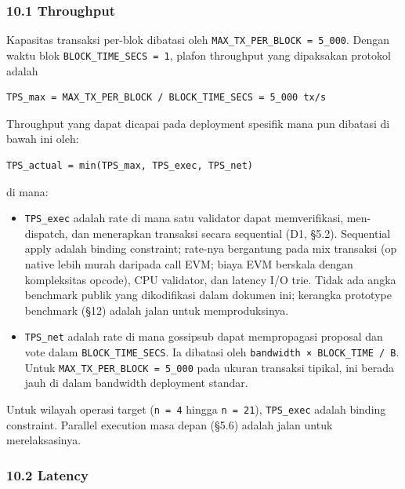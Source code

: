 \documentclass[11pt,a4paper]{article}
\providecommand{\tightlist}{\setlength{\itemsep}{0pt}\setlength{\parskip}{0pt}}
\begin{document}
\hypertarget{throughput}{%
\subsubsection{10.1 Throughput}\label{throughput}}

Kapasitas transaksi per-blok dibatasi oleh \texttt{MAX\_TX\_PER\_BLOCK\ =\ 5\_000}. Dengan waktu blok \texttt{BLOCK\_TIME\_SECS\ =\ 1}, plafon throughput yang dipaksakan protokol adalah

\begin{verbatim}
TPS_max = MAX_TX_PER_BLOCK / BLOCK_TIME_SECS = 5_000 tx/s
\end{verbatim}

Throughput yang dapat dicapai pada deployment spesifik mana pun dibatasi di bawah ini oleh:

\begin{verbatim}
TPS_actual = min(TPS_max, TPS_exec, TPS_net)
\end{verbatim}

di mana:

\begin{itemize}
\tightlist
\item
  \texttt{TPS\_exec} adalah rate di mana satu validator dapat memverifikasi, men-dispatch, dan menerapkan transaksi secara sequential (D1, §5.2). Sequential apply adalah binding constraint; rate-nya bergantung pada mix transaksi (op native lebih murah daripada call EVM; biaya EVM berskala dengan kompleksitas opcode), CPU validator, dan latency I/O trie. Tidak ada angka benchmark publik yang dikodifikasi dalam dokumen ini; kerangka prototype benchmark (§12) adalah jalan untuk memproduksinya.
\item
  \texttt{TPS\_net} adalah rate di mana gossipsub dapat mempropagasi proposal dan vote dalam \texttt{BLOCK\_TIME\_SECS}. Ia dibatasi oleh \texttt{bandwidth\ ×\ BLOCK\_TIME\ /\ \textbar{}B\textbar{}}. Untuk \texttt{MAX\_TX\_PER\_BLOCK\ =\ 5\_000} pada ukuran transaksi tipikal, ini berada jauh di dalam bandwidth deployment standar.
\end{itemize}

Untuk wilayah operasi target (\texttt{n\ =\ 4} hingga \texttt{n\ =\ 21}), \texttt{TPS\_exec} adalah binding constraint. Parallel execution masa depan (§5.6) adalah jalan untuk merelaksasinya.

\hypertarget{latency}{%
\subsubsection{10.2 Latency}\label{latency}}
\end{document}
